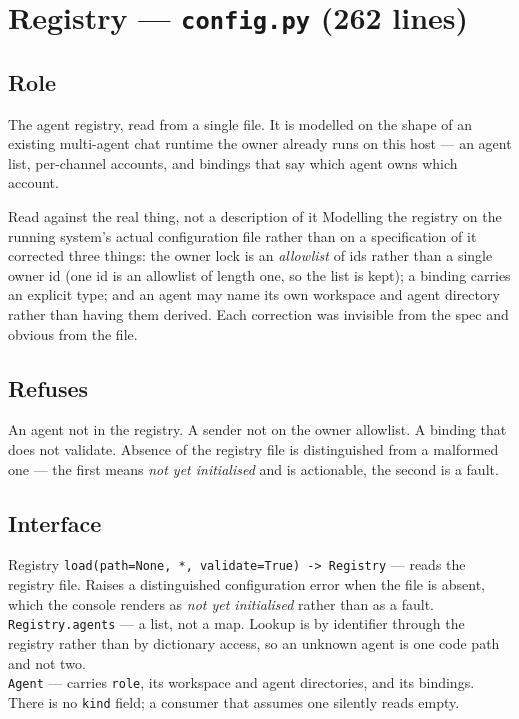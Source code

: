 \documentclass[11pt]{article}
\newcommand{\code}[1]{\texttt{\small #1}}
\begin{document}
\section{Registry --- \code{config.py} (262 lines)}
\label{sec:registry}

\subsection{Role}

The agent registry, read from a single file. It is modelled on the shape of an existing multi-agent chat runtime the owner already runs on this host --- an agent list, per-channel accounts, and bindings that say which agent owns which account.

\begin{notebox}{Read against the real thing, not a description of it}
Modelling the registry on the running system's actual configuration file rather than on a specification of it corrected three things: the owner lock is an \emph{allowlist} of ids rather than a single owner id (one id is an allowlist of length one, so the list is kept); a binding carries an explicit type; and an agent may name its own workspace and agent directory rather than having them derived. Each correction was invisible from the spec and obvious from the file.
\end{notebox}

\subsection{Refuses}

An agent not in the registry. A sender not on the owner allowlist. A binding that does not validate. Absence of the registry file is distinguished from a malformed one --- the first means \emph{not yet initialised} and is actionable, the second is a fault.

\subsection{Interface}

\begin{specbox}{Registry}
\code{load(path=None, *, validate=True) -> Registry} --- reads the registry file. Raises a distinguished configuration error when the file is absent, which the console renders as \emph{not yet initialised} rather than as a fault.\\[3pt]
\code{Registry.agents} --- a list, not a map. Lookup is by identifier through the registry rather than by dictionary access, so an unknown agent is one code path and not two.\\[3pt]
\code{Agent} --- carries \code{role}, its workspace and agent directories, and its bindings. There is no \code{kind} field; a consumer that assumes one silently reads empty.
\end{specbox}
\end{document}
